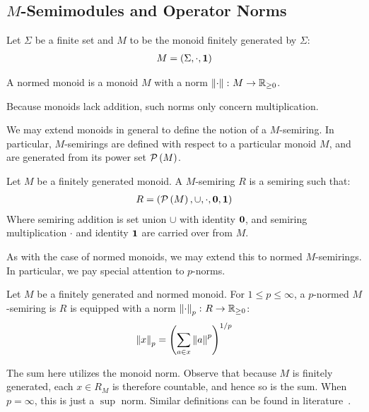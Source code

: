 
\subsection{\(M\)-Semimodules and Operator Norms}
Let \(\Sigma\) be a finite set and
\(M\) to be the monoid finitely generated by \(\Sigma\):
\begin{align*}
  M = \left(\Sigma, \cdot, \mathbf{1}\right)
\end{align*}

\begin{definition}
  A normed monoid is a monoid \(M\) with a norm
  \(\left\lVert\cdot\right\rVert \colon M \to \mathbb{R}_{\geq 0}\).
\end{definition}

Because monoids lack addition,
such norms only concern multiplication.

We may extend monoids in general to define the notion of a \(M\)-semiring.
In particular,
\(M\)-semirings are defined with respect to a particular monoid \(M\),
and are generated from its power set \(\mathcal{P}\left(M\right)\).

\begin{definition}[\(M\)-Semiring]
  Let \(M\) be a finitely generated monoid.
  A \(M\)-semiring \(R\) is a semiring such that:
  \begin{align*}
    R = \left(\mathcal{P}\left(M\right), \cup, \cdot, \mathbf{0}, \mathbf{1}\right)
  \end{align*}
  Where semiring addition is set union \(\cup\) with identity \(\mathbf{0}\),
  and semiring multiplication \(\cdot\) and identity \(\mathbf{1}\)
  are carried over from \(M\).
\end{definition}

As with the case of normed monoids,
we may extend this to normed \(M\)-semirings.
In particular, we pay special attention to \(p\)-norms.

\begin{definition}
  Let \(M\) be a finitely generated and normed monoid.
  For \(1 \leq p \leq \infty\),
  a \(p\)-normed \(M\)-semiring is \(R\)
  is equipped with a norm \(\left\lVert\cdot\right\rVert_p \colon R \to \mathbb{R}_{\geq 0}\):
  \begin{align*}
    \left\lVert x\right\rVert_{p} = \left(\sum_{a \in x} \left\lVert a\right\rVert ^p\right)^{1/p}
  \end{align*}
\end{definition}

The sum here utilizes the monoid norm.
Observe that because \(M\) is finitely generated,
each \(x \in R_M\) is therefore countable,
and hence so is the sum.
When \(p = \infty\), this is just a \(\sup\) norm.
Similar definitions can be found in literature~\cite{kudlek2000lemmata}.

